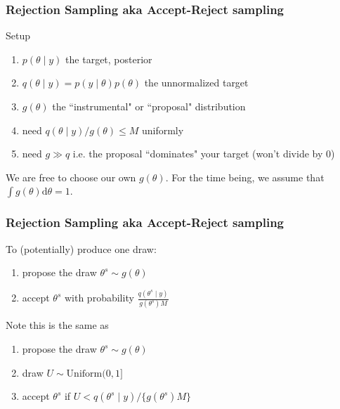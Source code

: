\documentclass{beamer}
\begin{document}
\begin{frame}[fragile]
\frametitle{Rejection Sampling aka Accept-Reject sampling}

Setup
\begin{enumerate}
\item $p(\theta \mid y)$ the target, posterior
\item $q(\theta \mid y) = p(y \mid \theta) p(\theta)$ the unnormalized target
\item $g(\theta)$ the ``instrumental" or ``proposal" distribution
\item need $q(\theta \mid y) / g(\theta) \le M$ uniformly
\item need $g \gg q$ i.e. the proposal ``dominates" your target (won't divide by $0$)
\end{enumerate}
We are free to choose our own $g(\theta)$. For the time being, we assume that $\int g(\theta) \text{d}\theta = 1$.

\end{frame}
\begin{frame}[fragile]
\frametitle{Rejection Sampling aka Accept-Reject sampling}


To (potentially) produce one draw:
\begin{enumerate}
\item propose the draw $\theta^s \sim g(\theta)$
\item accept $\theta^s$ with probability $\frac{q(\theta^s \mid y) }{ g(\theta^s)  M }$
\end{enumerate}
\pause

Note this is the same as
\begin{enumerate}
\item propose the draw $\theta^s \sim g(\theta)$
\item draw $U \sim \text{Uniform}(0,1]$
\item accept $\theta^s$ if $U < q(\theta^s \mid y) / \{ g(\theta^s)  M\}$
\end{enumerate}


\end{frame}
\end{document}
